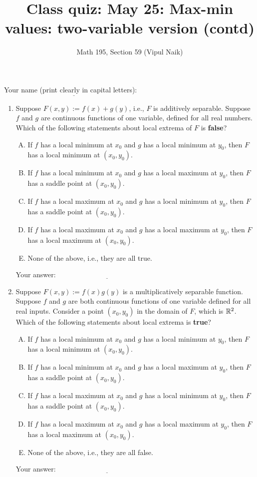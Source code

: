 \documentclass[10pt]{amsart}
\title{Class quiz: May 25: Max-min values: two-variable version (contd)}
\author{Math 195, Section 59 (Vipul Naik)}
\begin{document}
\maketitle

Your name (print clearly in capital letters): $\underline{\qquad\qquad\qquad\qquad\qquad\qquad\qquad\qquad\qquad\qquad}$

\begin{enumerate}
\item Suppose $F(x,y) := f(x) + g(y)$, i.e., $F$ is additively
  separable. Suppose $f$ and $g$ are continuous functions of one
  variable, defined for all real numbers. Which of the following
  statements about local extrema of $F$ is {\bf false}?

  \begin{enumerate}[(A)]
  \item If $f$ has a local minimum at $x_0$ and $g$ has a local
    minimum at $y_0$, then $F$ has a local minimum at $(x_0,y_0)$.
  \item If $f$ has a local minimum at $x_0$ and $g$ has a local
    maximum at $y_0$, then $F$ has a saddle point at $(x_0,y_0)$.
  \item If $f$ has a local maximum at $x_0$ and $g$ has a local
    minimum at $y_0$, then $F$ has a saddle point at $(x_0,y_0)$.
  \item If $f$ has a local maximum at $x_0$ and $g$ has a local
    maximum at $y_0$, then $F$ has a local maximum at $(x_0,y_0)$.
  \item None of the above, i.e., they are all true.
  \end{enumerate}
  
  \vspace{0.1in}
  Your answer: $\underline{\qquad\qquad\qquad\qquad\qquad\qquad\qquad}$
  \vspace{0.15in}

\item Suppose $F(x,y) := f(x)g(y)$ is a multiplicatively separable
  function. Suppose $f$ and $g$ are both continuous functions of
  one variable defined for all real inputs. Consider a point
  $(x_0,y_0)$ in the domain of $F$, which is $\mathbb{R}^2$. Which of the
  following statements about local extrema is {\bf true}?

  \begin{enumerate}[(A)]
  \item If $f$ has a local minimum at $x_0$ and $g$ has a local
    minimum at $y_0$, then $F$ has a local minimum at $(x_0,y_0)$.
  \item If $f$ has a local minimum at $x_0$ and $g$ has a local
    maximum at $y_0$, then $F$ has a saddle point at $(x_0,y_0)$.
  \item If $f$ has a local maximum at $x_0$ and $g$ has a local
    minimum at $y_0$, then $F$ has a saddle point at $(x_0,y_0)$.
  \item If $f$ has a local maximum at $x_0$ and $g$ has a local
    maximum at $y_0$, then $F$ has a local maximum at $(x_0,y_0)$.
  \item None of the above, i.e., they are all false.
  \end{enumerate}

  \vspace{0.1in}
  Your answer: $\underline{\qquad\qquad\qquad\qquad\qquad\qquad\qquad}$
  \vspace{0.15in}

\end{enumerate}
\end{document}
